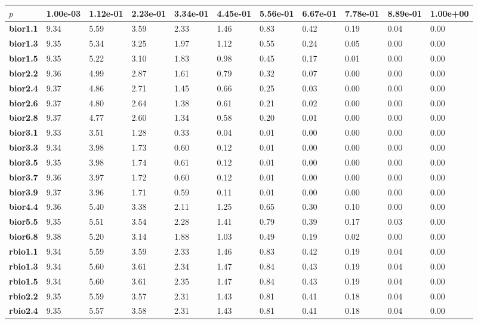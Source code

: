 \begin{tiny}\begin{longtable}{|l|l|l|l|l|l|l|l|l|l|l|}
\hline
$p$ &\textbf{1.00e-03}&\textbf{1.12e-01}&\textbf{2.23e-01}&\textbf{3.34e-01}&\textbf{4.45e-01}&\textbf{5.56e-01}&\textbf{6.67e-01}&\textbf{7.78e-01}&\textbf{8.89e-01}&\textbf{1.00e+00}\\\hline
\textbf{bior1.1}&9.34&5.59&3.59&2.33&1.46&0.83&0.42&0.19&0.04&0.00\\\hline
\textbf{bior1.3}&9.35&5.34&3.25&1.97&1.12&0.55&0.24&0.05&0.00&0.00\\\hline
\textbf{bior1.5}&9.35&5.22&3.10&1.83&0.98&0.45&0.17&0.01&0.00&0.00\\\hline
\textbf{bior2.2}&9.36&4.99&2.87&1.61&0.79&0.32&0.07&0.00&0.00&0.00\\\hline
\textbf{bior2.4}&9.37&4.86&2.71&1.45&0.66&0.25&0.03&0.00&0.00&0.00\\\hline
\textbf{bior2.6}&9.37&4.80&2.64&1.38&0.61&0.21&0.02&0.00&0.00&0.00\\\hline
\textbf{bior2.8}&9.37&4.77&2.60&1.34&0.58&0.20&0.01&0.00&0.00&0.00\\\hline
\textbf{bior3.1}&9.33&3.51&1.28&0.33&0.04&0.01&0.00&0.00&0.00&0.00\\\hline
\textbf{bior3.3}&9.34&3.98&1.73&0.60&0.12&0.01&0.00&0.00&0.00&0.00\\\hline
\textbf{bior3.5}&9.35&3.98&1.74&0.61&0.12&0.01&0.00&0.00&0.00&0.00\\\hline
\textbf{bior3.7}&9.36&3.97&1.72&0.60&0.12&0.01&0.00&0.00&0.00&0.00\\\hline
\textbf{bior3.9}&9.37&3.96&1.71&0.59&0.11&0.01&0.00&0.00&0.00&0.00\\\hline
\textbf{bior4.4}&9.36&5.40&3.38&2.11&1.25&0.65&0.30&0.10&0.00&0.00\\\hline
\textbf{bior5.5}&9.35&5.51&3.54&2.28&1.41&0.79&0.39&0.17&0.03&0.00\\\hline
\textbf{bior6.8}&9.38&5.20&3.14&1.88&1.03&0.49&0.19&0.02&0.00&0.00\\\hline
\textbf{rbio1.1}&9.34&5.59&3.59&2.33&1.46&0.83&0.42&0.19&0.04&0.00\\\hline
\textbf{rbio1.3}&9.34&5.60&3.61&2.34&1.47&0.84&0.43&0.19&0.04&0.00\\\hline
\textbf{rbio1.5}&9.34&5.60&3.61&2.35&1.47&0.84&0.43&0.19&0.04&0.00\\\hline
\textbf{rbio2.2}&9.35&5.59&3.57&2.31&1.43&0.81&0.41&0.18&0.04&0.00\\\hline
\textbf{rbio2.4}&9.35&5.57&3.58&2.31&1.43&0.81&0.41&0.18&0.04&0.00\\\hline

\end{longtable}
\end{tiny}
